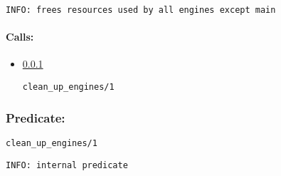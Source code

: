 {\small \begin{verbatim}
INFO: frees resources used by all engines except main

\end{verbatim}}
\paragraph{Calls:} 
\begin{itemize}
\item \ref{cleanV95WupV95WenginesV95W1} 
\begin{verbatim}
clean_up_engines/1
\end{verbatim}

\end{itemize}

\subsubsection{Predicate:} \label{cleanV95WupV95WenginesV95W1}

\begin{verbatim}
clean_up_engines/1
\end{verbatim}

{\small \begin{verbatim}
INFO: internal predicate

\end{verbatim}}
